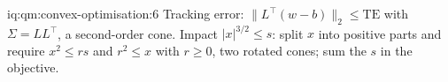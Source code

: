 \begin{solution}{iq:qm:convex-optimisation:6}
Tracking error: $\lVert L^\top(w - b)\rVert_2 \le \mathrm{TE}$ with $\Sigma = LL^\top$, a second-order cone. Impact $|x|^{3/2} \le s$: split $x$ into positive parts and require $x^2 \le rs$ and $r^2 \le x$ with
$r \ge 0$, two rotated cones; sum the $s$ in the objective.
\end{solution}
